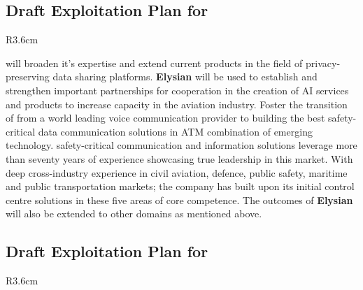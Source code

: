 \documentclass[a4paper,11pt]{article}
\newcommand{\project}[1]{\textbf{#1}\xspace}
\newcommand{\SECURITY}{\project{Elysian}}
\newcommand{\TheProject}{\SECURITY}
\begin{document}
\horizontalline

\subsection*{Draft Exploitation Plan for \FRQshort{}}
\vspace{-6pt}

\begin{wrapfigure}{R}{3.6cm}
\vspace{-1.3cm}
\hfill {}
\vspace{-0.8cm}
\end{wrapfigure}

\FRQlong{} will broaden it's expertise and extend current products in the field of privacy-preserving data sharing platforms.
\TheProject{} will be used to establish and strengthen important partnerships for cooperation in the creation of AI services and products to increase capacity in the aviation industry. Foster the transition of \FRQlong{} from a world leading voice communication provider to building the best safety-critical data communication solutions in ATM combination of emerging technology.
\FRQlong{} safety-critical communication and information solutions leverage more than seventy years of experience showcasing true leadership in this market. With deep cross-industry experience in civil aviation, defence, public safety, maritime and public transportation markets; the company has built upon its initial control centre solutions in these five areas of core competence. The outcomes of \TheProject{} will also be extended to other domains as mentioned above.

\horizontalline

\subsection*{Draft Exploitation Plan for \YAGshort{}}
\vspace{-6pt}

\begin{wrapfigure}{R}{3.6cm}
\vspace{-1.3cm}
\hfill {}
\vspace{-0.8cm}
\end{wrapfigure}
\end{document}
